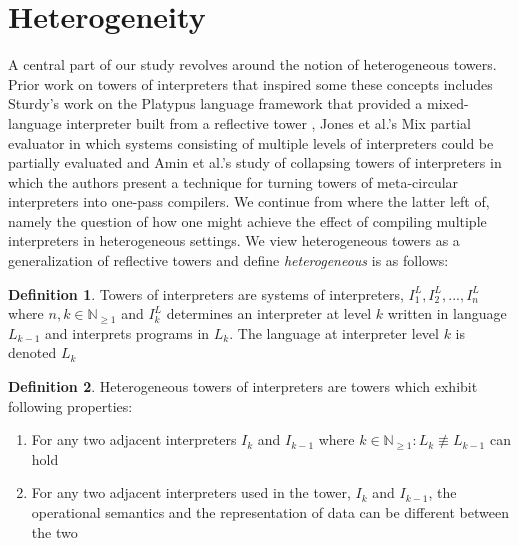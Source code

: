 \documentclass[a4paper,12pt,twoside,openright]{report}
\theoremstyle{definition}
\newtheorem{definition}{Definition}[section]
\begin{document}
\section{Heterogeneity}\label{sec:heterogeneity}
A central part of our study revolves around the notion of heterogeneous towers. Prior work on towers of interpreters that inspired some these concepts includes Sturdy's work on the Platypus language framework that provided a mixed-language interpreter built from a reflective tower \cite{sturdy1993lisp}, Jones et al.'s Mix partial evaluator \cite{jones1989mix} in which systems consisting of multiple levels of interpreters could be partially evaluated and Amin et al.'s study of collapsing towers of interpreters in which the authors present a technique for turning towers of meta-circular interpreters into one-pass compilers. We continue from where the latter left of, namely the question of how one might achieve the effect of compiling multiple interpreters in heterogeneous settings. We view heterogeneous towers as a generalization of reflective towers and define \textit{heterogeneous} is as follows:
\newline
\theoremstyle{definition}
\begin{definition}
	Towers of interpreters are systems of interpreters, $I^L_1, I^L_2, ..., I^L_n$ where $n,k \in \mathbb N_{\ge 1}$ and $I^L_k$ determines an interpreter at level $k$ written in language $L_{k-1}$ and interprets programs in $L_k$. The language at interpreter level $k$ is denoted $L_k$
\end{definition}

\begin{definition}
    \label{def:het}
	Heterogeneous towers of interpreters are towers which exhibit following properties:
	\begin{enumerate}
		\item For any two adjacent interpreters $I_k$ and $I_{k-1}$ where $k \in \mathbb N_{\ge 1}: L_k \not\equiv L_{k-1}$ can hold
		\item For any two adjacent interpreters used in the tower, $I_{k}$ and $I_{k-1}$, the operational semantics and the representation of data can be different between the two
	\end{enumerate}
\end{definition}
\end{document}
